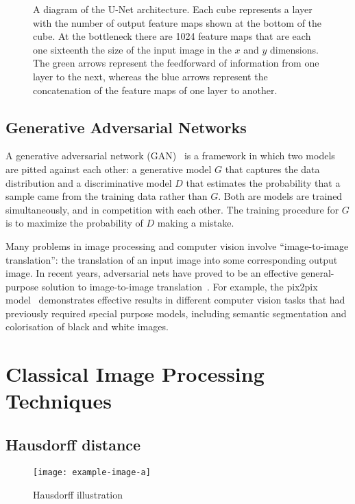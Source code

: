 \begin{figure}[t]
    \centering
    
    \caption{A diagram of the U-Net architecture. Each cube represents a layer with the number of output feature maps shown at the bottom of the cube. At the bottleneck there are 1024 feature maps that are each one sixteenth the size of the input image in the $x$ and $y$ dimensions. The green arrows represent the feedforward of information from one layer to the next, whereas the blue arrows represent the concatenation of the feature maps of one layer to another.}
    \label{fig:unet}
\end{figure}

\subsection{Generative Adversarial Networks}

A generative adversarial network (GAN)~\cite{gans} is a framework in which two models are pitted against each other: a generative model $G$ that captures the data distribution and a discriminative model $D$ that estimates the probability that a sample came from the training data rather than $G$. Both are models are trained simultaneously, and in competition with each other. The training procedure for $G$ is to maximize the probability of $D$ making a mistake.

Many problems in image processing and computer vision involve ``image-to-image translation'': the translation of an input image into some corresponding output image. In recent years, adversarial nets have proved to be an effective general-purpose solution to image-to-image translation~\cite{gansoverview}. For example, the pix2pix model~\cite{pix2pix} demonstrates effective results in different computer vision tasks that had previously required special purpose models, including semantic segmentation and colorisation of black and white images.

\section{Classical Image Processing Techniques}

\subsection{Hausdorff distance}
\label{sec:hausdorff}

\begin{figure}[t]
    \centering
    \texttt{[image: example-image-a]}
    \caption{Hausdorff illustration}
    \label{fig:hausdorff}
\end{figure}

